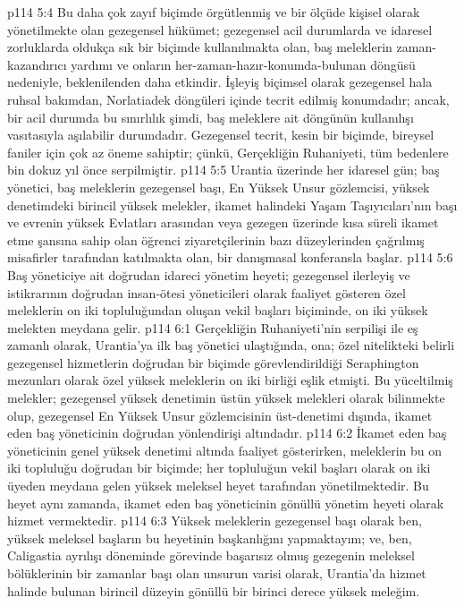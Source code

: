 \vs p114 5:4 Bu daha çok zayıf biçimde örgütlenmiş ve bir ölçüde kişisel olarak yönetilmekte olan gezegensel hükümet; gezegensel acil durumlarda ve idaresel zorluklarda oldukça sık bir biçimde kullanılmakta olan, baş meleklerin zaman\hyp{}kazandırıcı yardımı ve onların her\hyp{}zaman\hyp{}hazır\hyp{}konumda\hyp{}bulunan döngüsü nedeniyle, beklenilenden daha etkindir. İşleyiş biçimsel olarak gezegensel hala ruhsal bakımdan, Norlatiadek döngüleri içinde tecrit edilmiş konumdadır; ancak, bir acil durumda bu sınırlılık şimdi, baş meleklere ait döngünün kullanılışı vasıtasıyla aşılabilir durumdadır. Gezegensel tecrit, kesin bir biçimde, bireysel faniler için çok az öneme sahiptir; çünkü, Gerçekliğin Ruhaniyeti, tüm bedenlere bin dokuz yıl önce serpilmiştir.
\vs p114 5:5 Urantia üzerinde her idaresel gün; baş yönetici, baş meleklerin gezegensel başı, En Yüksek Unsur gözlemcisi, yüksek denetimdeki birincil yüksek melekler, ikamet halindeki Yaşam Taşıyıcıları’nın başı ve evrenin yüksek Evlatları arasından veya gezegen üzerinde kısa süreli ikamet etme şansına sahip olan öğrenci ziyaretçilerinin bazı düzeylerinden çağrılmış misafirler tarafından katılmakta olan, bir danışmasal konferansla başlar.
\vs p114 5:6 Baş yöneticiye ait doğrudan idareci yönetim heyeti; gezegensel ilerleyiş ve istikrarının doğrudan insan\hyp{}ötesi yöneticileri olarak faaliyet gösteren özel meleklerin on iki topluluğundan oluşan vekil başları biçiminde, on iki yüksek melekten meydana gelir.
\vs p114 6:1 Gerçekliğin Ruhaniyeti’nin serpilişi ile eş zamanlı olarak, Urantia’ya ilk baş yönetici ulaştığında, ona; özel nitelikteki belirli gezegensel hizmetlerin doğrudan bir biçimde görevlendirildiği Seraphington mezunları olarak özel yüksek meleklerin on iki birliği eşlik etmişti. Bu yüceltilmiş melekler; gezegensel yüksek denetimin üstün yüksek melekleri olarak bilinmekte olup, gezegensel En Yüksek Unsur gözlemcisinin üst\hyp{}denetimi dışında, ikamet eden baş yöneticinin doğrudan yönlendirişi altındadır.
\vs p114 6:2 İkamet eden baş yöneticinin genel yüksek denetimi altında faaliyet gösterirken, meleklerin bu on iki topluluğu doğrudan bir biçimde; her topluluğun vekil başları olarak on iki üyeden meydana gelen yüksek meleksel heyet tarafından yönetilmektedir. Bu heyet aynı zamanda, ikamet eden baş yöneticinin gönüllü yönetim heyeti olarak hizmet vermektedir.
\vs p114 6:3 Yüksek meleklerin gezegensel başı olarak ben, yüksek meleksel başların bu heyetinin başkanlığını yapmaktayım; ve, ben, Caligastia ayrılışı döneminde görevinde başarısız olmuş gezegenin meleksel bölüklerinin bir zamanlar başı olan unsurun varisi olarak, Urantia’da hizmet halinde bulunan birincil düzeyin gönüllü bir birinci derece yüksek meleğim.
